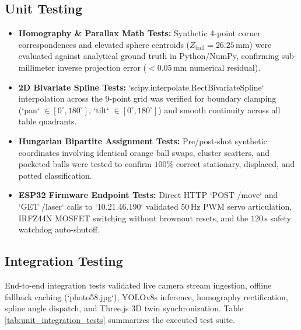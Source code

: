 \subsection{Unit Testing}
\begin{itemize}
    \item \textbf{Homography \& Parallax Math Tests:} Synthetic 4-point corner correspondences and elevated sphere centroids ($Z_{\text{ball}} = 26.25\,\text{mm}$) were evaluated against analytical ground truth in Python/NumPy, confirming sub-millimeter inverse projection error ($<0.05\,\text{mm}$ numerical residual).
    \item \textbf{2D Bivariate Spline Tests:} `scipy.interpolate.RectBivariateSpline` interpolation across the 9-point grid was verified for boundary clamping (`pan` $\in [0^\circ, 180^\circ]$, `tilt` $\in [0^\circ, 180^\circ]$) and smooth continuity across all table quadrants.
    \item \textbf{Hungarian Bipartite Assignment Tests:} Pre/post-shot synthetic coordinates involving identical orange ball swaps, cluster scatters, and pocketed balls were tested to confirm $100\%$ correct stationary, displaced, and potted classification.
    \item \textbf{ESP32 Firmware Endpoint Tests:} Direct HTTP `POST /move` and `GET /laser` calls to `10.21.46.190` validated $50\,\text{Hz}$ PWM servo articulation, IRFZ44N MOSFET switching without brownout resets, and the $120\,\text{s}$ safety watchdog auto-shutoff.
\end{itemize}

\subsection{Integration Testing}
End-to-end integration tests validated live camera stream ingestion, offline fallback caching (`photo58.jpg`), YOLOv8s inference, homography rectification, spline angle dispatch, and Three.js 3D twin synchronization. Table \ref{tab:unit_integration_tests} summarizes the executed test suite.

